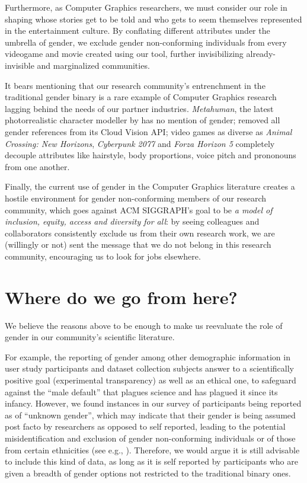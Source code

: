 \documentclass[sigconf,review,balance=false]{acmart}
\begin{document}
Furthermore, as Computer Graphics researchers, we must consider our role in
shaping whose stories get to be told and who gets to seem themselves represented
in the entertainment culture. By conflating different attributes under the
umbrella of gender, we exclude gender non-conforming individuals from every
videogame and movie created using our tool, further invisibilizing
already-invisible and marginalized communities.

It bears mentioning that our research community's entrenchment in the
traditional gender binary is a rare example of Computer Graphics research
lagging behind the needs of our partner industries. \emph{Metahuman}, the latest
photorrealistic character modeller by \citet{metahuman} has no mention of
gender; \citet{googlegender} removed all gender references from its Cloud Vision
API; video games as diverse as \emph{Animal Crossing: New Horizons},
\emph{Cyberpunk 2077} and \emph{Forza Horizon 5} completely decouple attributes
like hairstyle, body proportions, voice pitch and prononouns from one another. 

Finally, the current use of gender in the Computer Graphics literature creates a
hostile environment for gender non-conforming members of our research community,
which goes against ACM SIGGRAPH's goal to be \emph{a model of inclusion, equity,
access and diversity for all}:  by seeing colleagues and collaborators
consistently exclude us  from their own research work, we are (willingly or not)
sent the message that we do not belong in this research community, encouraging
us to look for jobs elsewhere.

\section{Where do we go from here?}

We believe the reasons above to be enough to make us reevaluate the role of
gender in our community's scientific literature.

For example, the reporting of gender among other demographic information in user
study participants and dataset collection subjects answer to a scientifically
positive goal (experimental transparency) as well as an ethical one, to
safeguard against the “male default” that plagues science and has plagued it
since its infancy. However, we found instances in our survey of participants
being reported as of “unknown gender”, which may indicate that their gender is
being assumed post facto by researchers as opposed to self reported, leading to
the potential misidentification and exclusion of gender non-conforming
individuals or of those from certain ethnicities (see e.g.,
\cite{santamaria2018comparison,buolamwini2018gender}). Therefore, we would argue
it is still advisable to include this kind of data, as long as it is self
reported by participants who are given a breadth of gender options not
restricted to the traditional binary ones.
\end{document}
